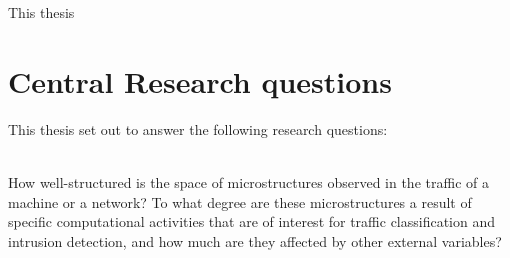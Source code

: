 
This thesis 

%
%
%
%
%

\section{Central Research questions}\label{Sec:Reseach_questions}

This thesis set out to answer the following research questions:

\begin{rquestion}\ \\ 
How well-structured is the space of microstructures observed in the traffic of a machine or a network? To what degree are these microstructures a result of specific computational activities that are of interest for traffic classification and intrusion detection, and how much are they affected by other external variables?

\end{rquestion}



